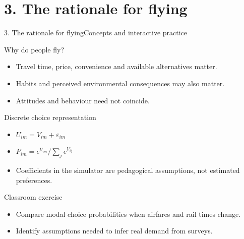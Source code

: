 \documentclass[aspectratio=169,11pt]{beamer}
\begin{document}
\section{3. The rationale for flying}
\begin{frame}{3. The rationale for flying}\centering\Large Concepts and interactive practice\end{frame}
\begin{frame}{Why do people fly?}\begin{itemize}
\item Travel time, price, convenience and available alternatives matter.
\item Habits and perceived environmental consequences may also matter.
\item Attitudes and behaviour need not coincide.
\end{itemize}\end{frame}
\begin{frame}{Discrete choice representation}\begin{itemize}
\item $U_{im}=V_{im}+\varepsilon_{im}$
\item $P_{im}=e^{V_{im}}/\sum_j e^{V_{ij}}$
\item Coefficients in the simulator are pedagogical assumptions, not estimated preferences.
\end{itemize}\end{frame}
\begin{frame}{Classroom exercise}\begin{itemize}
\item Compare modal choice probabilities when airfares and rail times change.
\item Identify assumptions needed to infer real demand from surveys.
\end{itemize}\end{frame}
\end{document}
